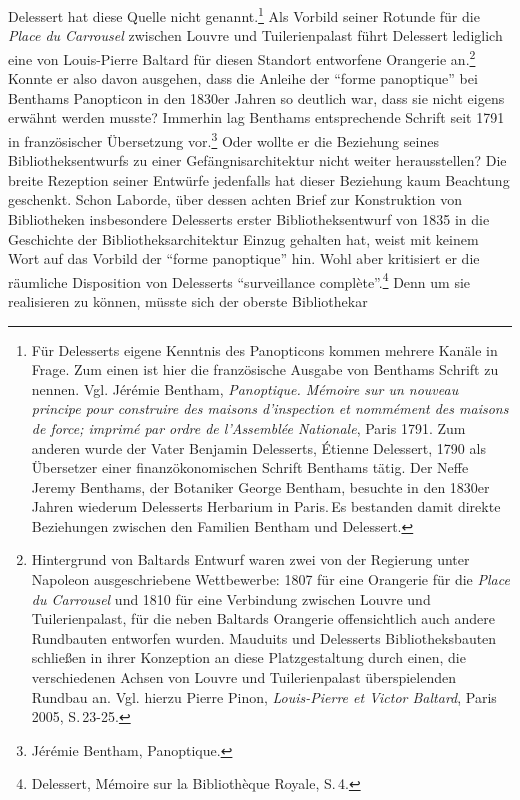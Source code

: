 Delessert hat diese Quelle nicht genannt.\footnote{Für Delesserts eigene
  Kenntnis des Panopticons kommen mehrere Kanäle in Frage. Zum einen ist
  hier die französische Ausgabe von Benthams Schrift zu nennen. Vgl.
  Jérémie Bentham, \emph{Panoptique. Mémoire sur un nouveau principe
  pour construire des maisons d'inspection et nommément des maisons de
  force; imprimé par ordre de l'Assemblée Nationale}, Paris 1791. Zum
  anderen wurde der Vater Benjamin Delesserts, Étienne Delessert, 1790
  als Übersetzer einer finanzökonomischen Schrift Benthams tätig. Der
  Neffe Jeremy Benthams, der Botaniker George Bentham, besuchte in den
  1830er Jahren wiederum Delesserts Herbarium in Paris.\,Es bestanden
  damit direkte Beziehungen zwischen den Familien Bentham und Delessert.}
Als Vorbild seiner Rotunde für die \emph{Place du Carrousel} zwischen
Louvre und Tuilerienpalast führt Delessert lediglich eine von
Louis-Pierre Baltard für diesen Standort entworfene Orangerie
an.\footnote{Hintergrund von Baltards Entwurf waren zwei von der
  Regierung unter Napoleon ausgeschriebene Wettbewerbe: 1807 für eine
  Orangerie für die \emph{Place du Carrousel} und 1810 für eine
  Verbindung zwischen Louvre und Tuilerienpalast, für die neben Baltards
  Orangerie offensichtlich auch andere Rundbauten entworfen wurden.
  Mauduits und Delesserts Bibliotheksbauten schließen in ihrer
  Konzeption an diese Platzgestaltung durch einen, die verschiedenen
  Achsen von Louvre und Tuilerienpalast überspielenden Rundbau an. Vgl.
  hierzu Pierre Pinon, \emph{Louis-Pierre et Victor Baltard}, Paris
  2005, S.\,23-25.} Konnte er also davon ausgehen, dass die Anleihe der
\enquote{forme panoptique} bei Benthams Panopticon in den 1830er Jahren
so deutlich war, dass sie nicht eigens erwähnt werden musste? Immerhin
lag Benthams entsprechende Schrift seit 1791 in französischer
Übersetzung vor.\footnote{Jérémie Bentham, Panoptique.} Oder wollte er
die Beziehung seines Bibliotheksentwurfs zu einer Gefängnisarchitektur
nicht weiter herausstellen? Die breite Rezeption seiner Entwürfe
jedenfalls hat dieser Beziehung kaum Beachtung geschenkt. Schon Laborde,
über dessen achten Brief zur Konstruktion von Bibliotheken insbesondere
Delesserts erster Bibliotheksentwurf von 1835 in die Geschichte der
Bibliotheksarchitektur Einzug gehalten hat, weist mit keinem Wort auf
das Vorbild der \enquote{forme panoptique} hin. Wohl aber kritisiert er
die räumliche Disposition von Delesserts \enquote{surveillance
complète}.\footnote{Delessert, Mémoire sur la Bibliothèque Royale, S.\,4.}
Denn um sie realisieren zu können, müsste sich der oberste Bibliothekar
